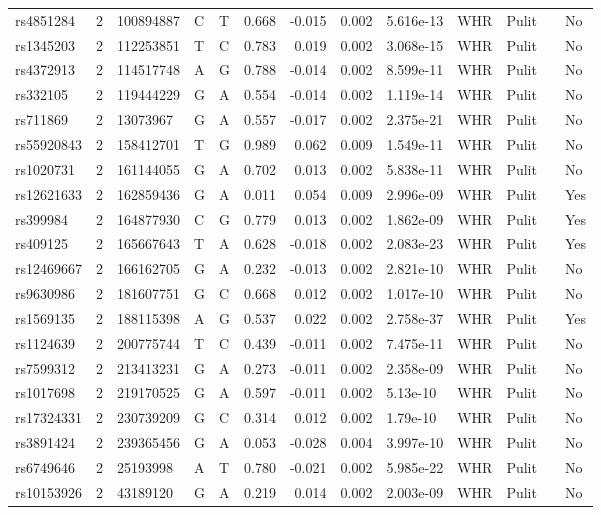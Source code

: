 \documentclass[11pt,twoside]{bristolthesis}
\begin{document}
\begin{longtable}[t]{lrlllrrrlllll}
rs4851284 & 2 & 100894887 & C & T & 0.668 & -0.015 & 0.002 & 5.616e-13 & WHR & Pulit &  & No\\
rs1345203 & 2 & 112253851 & T & C & 0.783 & 0.019 & 0.002 & 3.068e-15 & WHR & Pulit &  & No\\
rs4372913 & 2 & 114517748 & A & G & 0.788 & -0.014 & 0.002 & 8.599e-11 & WHR & Pulit &  & No\\
rs332105 & 2 & 119444229 & G & A & 0.554 & -0.014 & 0.002 & 1.119e-14 & WHR & Pulit &  & No\\
rs711869 & 2 & 13073967 & G & A & 0.557 & -0.017 & 0.002 & 2.375e-21 & WHR & Pulit &  & No\\
\addlinespace
rs55920843 & 2 & 158412701 & T & G & 0.989 & 0.062 & 0.009 & 1.549e-11 & WHR & Pulit &  & No\\
rs1020731 & 2 & 161144055 & G & A & 0.702 & 0.013 & 0.002 & 5.838e-11 & WHR & Pulit &  & No\\
rs12621633 & 2 & 162859436 & G & A & 0.011 & 0.054 & 0.009 & 2.996e-09 & WHR & Pulit &  & Yes\\
rs399984 & 2 & 164877930 & C & G & 0.779 & 0.013 & 0.002 & 1.862e-09 & WHR & Pulit &  & Yes\\
rs409125 & 2 & 165667643 & T & A & 0.628 & -0.018 & 0.002 & 2.083e-23 & WHR & Pulit &  & Yes\\
\addlinespace
rs12469667 & 2 & 166162705 & G & A & 0.232 & -0.013 & 0.002 & 2.821e-10 & WHR & Pulit &  & No\\
rs9630986 & 2 & 181607751 & G & C & 0.668 & 0.012 & 0.002 & 1.017e-10 & WHR & Pulit &  & No\\
rs1569135 & 2 & 188115398 & A & G & 0.537 & 0.022 & 0.002 & 2.758e-37 & WHR & Pulit &  & Yes\\
rs1124639 & 2 & 200775744 & T & C & 0.439 & -0.011 & 0.002 & 7.475e-11 & WHR & Pulit &  & No\\
rs7599312 & 2 & 213413231 & G & A & 0.273 & -0.011 & 0.002 & 2.358e-09 & WHR & Pulit &  & No\\
\addlinespace
rs1017698 & 2 & 219170525 & G & A & 0.597 & -0.011 & 0.002 & 5.13e-10 & WHR & Pulit &  & No\\
rs17324331 & 2 & 230739209 & G & C & 0.314 & 0.012 & 0.002 & 1.79e-10 & WHR & Pulit &  & No\\
rs3891424 & 2 & 239365456 & G & A & 0.053 & -0.028 & 0.004 & 3.997e-10 & WHR & Pulit &  & No\\
rs6749646 & 2 & 25193998 & A & T & 0.780 & -0.021 & 0.002 & 5.985e-22 & WHR & Pulit &  & No\\
rs10153926 & 2 & 43189120 & G & A & 0.219 & 0.014 & 0.002 & 2.003e-09 & WHR & Pulit &  & No\\

\end{longtable}
\end{document}
